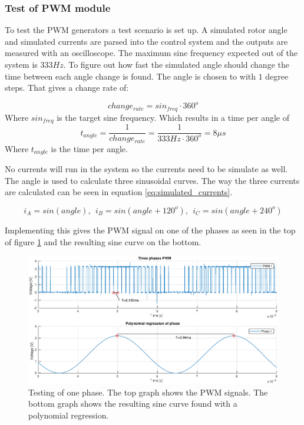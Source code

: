 \subsubsection*{Test of PWM module}

To test the PWM generators a test scenario is set up. A simulated rotor angle and simulated currents are parsed into the control system and the outputs are measured with an oscilloscope. 
The maximum sine frequency expected out of the system is $333Hz$. To figure out how fast the simulated angle should change the time between each angle change is found. 
The angle is chosen to with $1$ degree steps. That gives a change rate of:


\begin{equation}
    change_{rate} = sin_{freq} \cdot 360^o
\end{equation}
Where $sin_{freq}$ is the target sine frequency. Which results in a time per angle of
\begin{equation}
    t_{angle} = \frac{1}{change_{rate}} = \frac{1}{333Hz \cdot 360^o} = 8 \mu s
\end{equation}
Where $t_{angle}$ is the time per angle. 

No currents will run in the system so the currents need to be simulate as well. The angle is used to calculate three sinusoidal curves. The way the three currents are calculated can be seen in equation \ref{eq:simulated_currents}.

\begin{equation}
    i_A = sin(angle), \ \ i_B = sin(angle + 120^o), \ \ i_C = sin(angle + 240^o)
    \label{eq:simulated_currents}
\end{equation}


Implementing this gives the PWM signal on one of the phases as seen in the top of figure \ref{fig:one_phase} and the resulting sine curve on the bottom.

\begin{figure}[H]
	\centering
	\includegraphics[width=1 \textwidth]{pictures/software/one_phase.eps}
	\caption{Testing of one phase. The top graph shows the PWM signals. The bottom graph shows the resulting sine curve found with a polynomial regression.}
	\label{fig:one_phase}
\end{figure}

